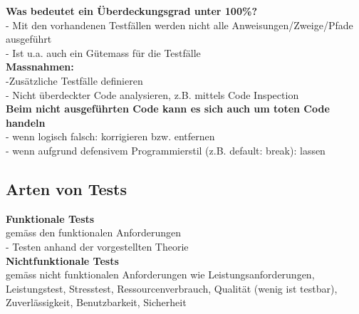 \textbf{Was bedeutet ein Überdeckungsgrad unter 100\%?} \\
- Mit den vorhandenen Testfällen werden nicht alle Anweisungen/Zweige/Pfade ausgeführt \\
- Ist u.a. auch ein Gütemass für die Testfälle \\
\textbf{Massnahmen:} \\
-Zusätzliche Testfälle definieren \\
- Nicht überdeckter Code analysieren, z.B. mittels Code Inspection \\
\textbf{Beim nicht ausgeführten Code kann es sich auch um toten Code handeln} \\
- wenn logisch falsch: korrigieren bzw. entfernen \\
- wenn aufgrund defensivem Programmierstil (z.B. default: break): lassen \\

\subsection{Arten von Tests}

\textbf{Funktionale Tests} \\
gemäss den funktionalen Anforderungen \\
- Testen anhand der vorgestellten Theorie \\
\textbf{Nichtfunktionale Tests} \\
gemäss nicht funktionalen Anforderungen wie Leistungsanforderungen, Leistungstest,  Stresstest, Ressourcenverbrauch, Qualität (wenig ist testbar), Zuverlässigkeit,  Benutzbarkeit, Sicherheit